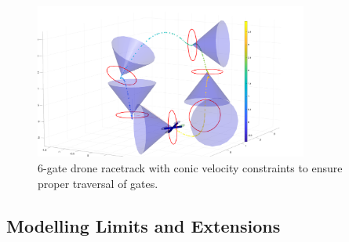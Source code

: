 \begin{figure}[htbp]
  \centering
  \includegraphics[width=0.8\textwidth, trim=700 0 0 0, clip]{img/DroneRaceTrajectoryOptWCones.png}
  \caption{6-gate drone racetrack with conic velocity constraints to ensure proper traversal of gates.}
  \label{fig:optimized_controls}
\end{figure}

\subsection{Modelling Limits and Extensions}
